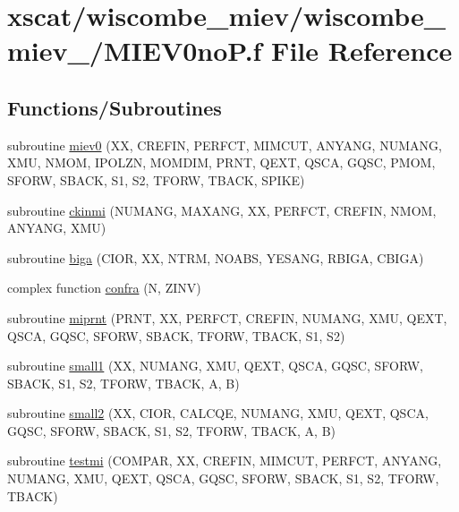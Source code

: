 \hypertarget{wiscombe__miev__1_2_m_i_e_v0no_p_8f}{}\section{xscat/wiscombe\+\_\+miev/wiscombe\+\_\+miev\+\_/\+M\+I\+E\+V0noP.f File Reference}
\label{wiscombe__miev__1_2_m_i_e_v0no_p_8f}
\subsection*{Functions/\+Subroutines}
\begin{DoxyCompactItemize}
\item 
subroutine \hyperlink{wiscombe__miev__1_2_m_i_e_v0no_p_8f_a48092e733ab76cc9db0501ed3b28d9ff}{miev0} (XX, C\+R\+E\+F\+IN, P\+E\+R\+F\+CT, M\+I\+M\+C\+UT, A\+N\+Y\+A\+NG, N\+U\+M\+A\+NG, X\+MU, N\+M\+OM, I\+P\+O\+L\+ZN, M\+O\+M\+D\+IM, P\+R\+NT, Q\+E\+XT, Q\+S\+CA, G\+Q\+SC, P\+M\+OM, S\+F\+O\+RW, S\+B\+A\+CK, S1, S2, T\+F\+O\+RW, T\+B\+A\+CK, S\+P\+I\+KE)
\item 
subroutine \hyperlink{wiscombe__miev__1_2_m_i_e_v0no_p_8f_a06fe91ee97b1295c97915feaad0d2e13}{ckinmi} (N\+U\+M\+A\+NG, M\+A\+X\+A\+NG, XX, P\+E\+R\+F\+CT, C\+R\+E\+F\+IN, N\+M\+OM, A\+N\+Y\+A\+NG, X\+MU)
\item 
subroutine \hyperlink{wiscombe__miev__1_2_m_i_e_v0no_p_8f_affcbe26d3e8beb59e07c207f2b0da43a}{biga} (C\+I\+OR, XX, N\+T\+RM, N\+O\+A\+BS, Y\+E\+S\+A\+NG, R\+B\+I\+GA, C\+B\+I\+GA)
\item 
complex function \hyperlink{wiscombe__miev__1_2_m_i_e_v0no_p_8f_ad91aace4d77229d367c28c78965a0bd5}{confra} (N, Z\+I\+NV)
\item 
subroutine \hyperlink{wiscombe__miev__1_2_m_i_e_v0no_p_8f_ae5c893640b8e33659ca8a9eb3c3c26ce}{miprnt} (P\+R\+NT, XX, P\+E\+R\+F\+CT, C\+R\+E\+F\+IN, N\+U\+M\+A\+NG, X\+MU, Q\+E\+XT, Q\+S\+CA, G\+Q\+SC, S\+F\+O\+RW, S\+B\+A\+CK, T\+F\+O\+RW, T\+B\+A\+CK, S1, S2)
\item 
subroutine \hyperlink{wiscombe__miev__1_2_m_i_e_v0no_p_8f_a42db51d8245d25e068704071519e108f}{small1} (XX, N\+U\+M\+A\+NG, X\+MU, Q\+E\+XT, Q\+S\+CA, G\+Q\+SC, S\+F\+O\+RW, S\+B\+A\+CK, S1, S2, T\+F\+O\+RW, T\+B\+A\+CK, A, B)
\item 
subroutine \hyperlink{wiscombe__miev__1_2_m_i_e_v0no_p_8f_a4bae82b3142e7b49e6b14b735ea23988}{small2} (XX, C\+I\+OR, C\+A\+L\+C\+QE, N\+U\+M\+A\+NG, X\+MU, Q\+E\+XT, Q\+S\+CA, G\+Q\+SC, S\+F\+O\+RW, S\+B\+A\+CK, S1, S2, T\+F\+O\+RW, T\+B\+A\+CK, A, B)
\item 
subroutine \hyperlink{wiscombe__miev__1_2_m_i_e_v0no_p_8f_aa46efb14b8780b792d5cdaecc7693068}{testmi} (C\+O\+M\+P\+AR, XX, C\+R\+E\+F\+IN, M\+I\+M\+C\+UT, P\+E\+R\+F\+CT, A\+N\+Y\+A\+NG, N\+U\+M\+A\+NG, X\+MU, Q\+E\+XT, Q\+S\+CA, G\+Q\+SC, S\+F\+O\+RW, S\+B\+A\+CK, S1, S2, T\+F\+O\+RW, T\+B\+A\+CK)
\end{DoxyCompactItemize}


